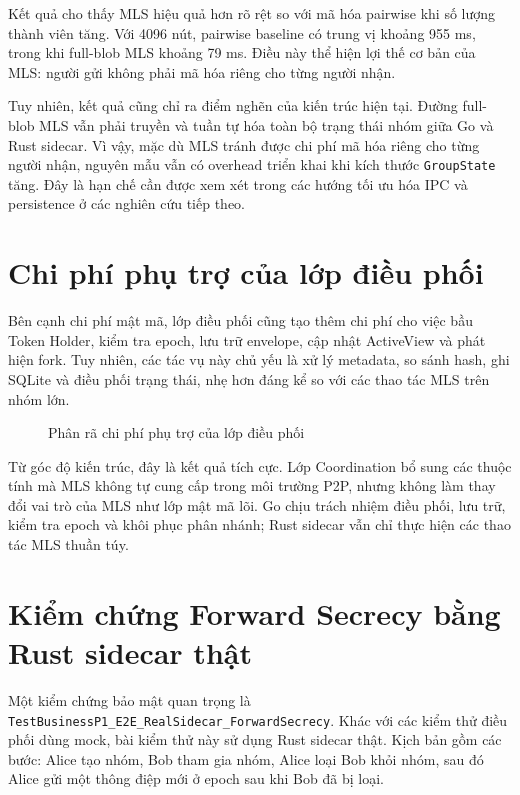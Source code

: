 \documentclass[../DoAn.tex]{subfiles}
\begin{document}
	Kết quả cho thấy MLS hiệu quả hơn rõ rệt so với mã hóa pairwise khi số lượng thành viên tăng. Với 4096 nút, pairwise baseline có trung vị khoảng 955 ms, trong khi full-blob MLS khoảng 79 ms. Điều này thể hiện lợi thế cơ bản của MLS: người gửi không phải mã hóa riêng cho từng người nhận.
	
	Tuy nhiên, kết quả cũng chỉ ra điểm nghẽn của kiến trúc hiện tại. Đường full-blob MLS vẫn phải truyền và tuần tự hóa toàn bộ trạng thái nhóm giữa Go và Rust sidecar. Vì vậy, mặc dù MLS tránh được chi phí mã hóa riêng cho từng người nhận, nguyên mẫu vẫn có overhead triển khai khi kích thước \texttt{GroupState} tăng. Đây là hạn chế cần được xem xét trong các hướng tối ưu hóa IPC và persistence ở các nghiên cứu tiếp theo.
	
	\section{Chi phí phụ trợ của lớp điều phối}
	\label{sec:coordinator_overhead}
	
	Bên cạnh chi phí mật mã, lớp điều phối cũng tạo thêm chi phí cho việc bầu Token Holder, kiểm tra epoch, lưu trữ envelope, cập nhật ActiveView và phát hiện fork. Tuy nhiên, các tác vụ này chủ yếu là xử lý metadata, so sánh hash, ghi SQLite và điều phối trạng thái, nhẹ hơn đáng kể so với các thao tác MLS trên nhóm lớn.
	
	\begin{figure}[htbp]
		\centering
		\caption{Phân rã chi phí phụ trợ của lớp điều phối}
		\label{fig:coordinator_overhead}
	\end{figure}
	
	Từ góc độ kiến trúc, đây là kết quả tích cực. Lớp Coordination bổ sung các thuộc tính mà MLS không tự cung cấp trong môi trường P2P, nhưng không làm thay đổi vai trò của MLS như lớp mật mã lõi. Go chịu trách nhiệm điều phối, lưu trữ, kiểm tra epoch và khôi phục phân nhánh; Rust sidecar vẫn chỉ thực hiện các thao tác MLS thuần túy.
	
	\section{Kiểm chứng Forward Secrecy bằng Rust sidecar thật}
	\label{sec:forward_secrecy}
	
	Một kiểm chứng bảo mật quan trọng là \texttt{TestBusinessP1\_E2E\_RealSidecar\_ForwardSecrecy}. Khác với các kiểm thử điều phối dùng mock, bài kiểm thử này sử dụng Rust sidecar thật. Kịch bản gồm các bước: Alice tạo nhóm, Bob tham gia nhóm, Alice loại Bob khỏi nhóm, sau đó Alice gửi một thông điệp mới ở epoch sau khi Bob đã bị loại.
	
\end{document}

